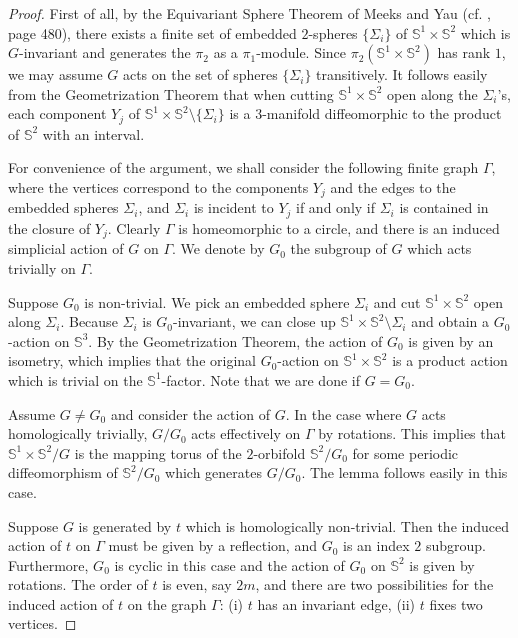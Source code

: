 \documentclass[11pt]{amsart}
\theoremstyle{plain}
\numberwithin{theorem}{section}
\theoremstyle{definition}
\begin{document}
\begin{proof}
First of all, by the Equivariant Sphere Theorem of Meeks and Yau (cf. \cite{MY}, page 480), there exists a 
finite set of embedded $2$-spheres $\{\Sigma_i\}$ of ${{\mathbb S}}^1\times{{\mathbb S}}^2$ which is $G$-invariant and 
generates the $\pi_2$ as a $\pi_1$-module. Since $\pi_2({{\mathbb S}}^1\times{{\mathbb S}}^2)$ has rank $1$, we may 
assume $G$ acts on the set of spheres $\{\Sigma_i\}$ transitively. It follows easily from the 
Geometrization Theorem that when cutting ${{\mathbb S}}^1\times{{\mathbb S}}^2$ open along the $\Sigma_i$'s, 
each component $Y_j$ of ${{\mathbb S}}^1\times{{\mathbb S}}^2\setminus \{\Sigma_i\}$ is a 
$3$-manifold diffeomorphic to the product of ${{\mathbb S}}^2$ with an interval. 

For convenience of the argument, we shall consider the following finite graph $\Gamma$, where the
vertices correspond to the components $Y_j$ and the edges to the embedded spheres $\Sigma_i$,
and $\Sigma_i$ is incident to $Y_j$ if and only if $\Sigma_i$ is contained in the closure of $Y_j$. 
Clearly $\Gamma$ is homeomorphic to a circle, and there is an induced simplicial action of $G$ on 
$\Gamma$. We denote by $G_0$ the subgroup of $G$ which acts trivially on $\Gamma$. 

Suppose $G_0$ is non-trivial. We pick an embedded sphere $\Sigma_i$ and cut ${{\mathbb S}}^1\times{{\mathbb S}}^2$
open along $\Sigma_i$. Because $\Sigma_i$ is $G_0$-invariant, we can close up 
${{\mathbb S}}^1\times{{\mathbb S}}^2\setminus \Sigma_i$ and obtain a $G_0$-action on ${{\mathbb S}}^3$. By the Geometrization
Theorem, the action of $G_0$ is given by an isometry, which implies that  the original 
$G_0$-action on ${{\mathbb S}}^1\times {{\mathbb S}}^2$ is a product action which is trivial on the ${{\mathbb S}}^1$-factor. 
Note that we are done if $G=G_0$.

Assume $G\neq G_0$ and consider the action of $G$. In the case where $G$ acts homologically 
trivially, $G/G_0$ acts effectively on $\Gamma$ by rotations. This implies that ${{\mathbb S}}^1\times{{\mathbb S}}^2/G$ 
is the mapping torus of the $2$-orbifold ${{\mathbb S}}^2/G_0$ for some periodic diffeomorphism of ${{\mathbb S}}^2/G_0$ 
which generates $G/G_0$. The lemma follows easily in this case.

Suppose $G$ is generated by $t$ which is homologically non-trivial. Then the induced action 
of $t$ on $\Gamma$ must be given by a reflection, and $G_0$ is an index $2$ subgroup. Furthermore, $G_0$ is cyclic in this case and the action of $G_0$ on ${{\mathbb S}}^2$ is given by rotations. 
The order of $t$ is even, say $2m$, and there are two possibilities for the induced action of $t$ on the 
graph $\Gamma$: (i) $t$ has an invariant edge, (ii) $t$ fixes two vertices. 


\end{proof}
\end{document}
